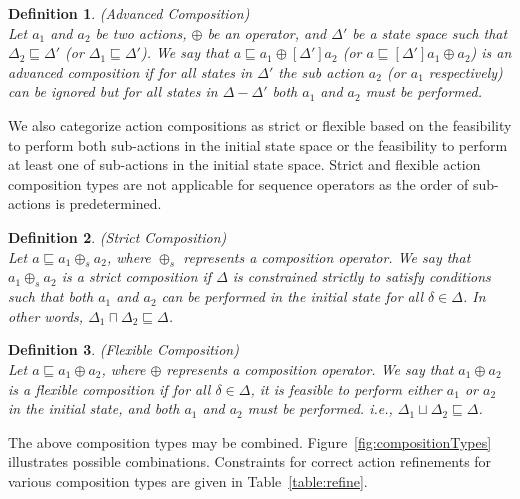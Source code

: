 \documentclass[12pt,journal,letterpaper,onecolumn]{IEEEtran}
\newtheorem{definition}{Definition}[section]
\begin{document}
\begin{definition}(Advanced Composition)\\
\label{def:advanced}  Let $a_1$ and $a_2$ be two actions, $\oplus$
be an operator, and $\Delta'$ be a state space such that $\Delta_2
\sqsubseteq \Delta'$ (or $\Delta_1 \sqsubseteq \Delta'$). We say
that $a\sqsubseteq a_1 \oplus [\Delta']a_2$ (or $a\sqsubseteq
[\Delta']a_1 \oplus a_2$) is an advanced composition if for all
states in $\Delta'$ the sub action $a_2$ (or $a_1$ respectively) can
be ignored but for all states in $\Delta - \Delta'$ both $a_1$ and
$a_2$ must be performed.
\end{definition}

We also categorize action compositions as strict or flexible
based on the feasibility to perform both sub-actions in the initial
state space or the feasibility to perform at least one of
sub-actions in the initial state space. Strict and flexible action
composition types are not applicable for sequence operators as the
order of sub-actions is predetermined.

\begin{definition}(Strict Composition)\\
\label{def:strict} Let $a \sqsubseteq a_1 \oplus_s a_2$, where
$\oplus_s$ represents a composition operator. We say that $a_1
\oplus_s a_2$ is a strict composition if $\Delta$ is constrained
strictly to satisfy conditions such that {\em both} $a_1$ and $a_2$
can be performed in the initial state for all $\delta \in \Delta$.
In other words, $\Delta_1 \sqcap \Delta_2 \sqsubseteq \Delta$.
\end{definition}


\begin{definition}(Flexible Composition)\\
\label{def:flexible} Let $a \sqsubseteq a_1 \oplus a_2$, where
$\oplus$ represents a composition operator. We say that $a_1 \oplus
a_2$ is a flexible composition if for all $\delta \in \Delta$, it is
feasible to perform {\em either} $a_1$ or $a_2$ in the initial
state, and both $a_1$ and $a_2$ must be performed. i.e., $\Delta_1
\sqcup \Delta_2 \sqsubseteq \Delta$.
\end{definition}

The above composition types may be combined.
Figure~\ref{fig:compositionTypes} illustrates possible combinations.
Constraints for correct action refinements for various composition
types are given in Table~\ref{table:refine}.
\end{document}
